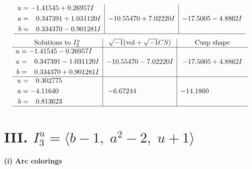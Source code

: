 \documentclass[1p]{elsarticle_modified}
\theoremstyle{definition}
\newcommand{\I}{\sqrt{-1}}
\begin{document}
$$\begin{array}{c|c|c}
\begin{aligned}
u &= -1.41545 + 0.26957 I \\
a &= \phantom{-}0.347391 + 1.031120 I \\
b &= \phantom{-}0.334370 - 0.901281 I\end{aligned}
 & -10.55470 + 7.02220 I & -17.5005 - 4.8862 I\\
 \hline 
 \end{array}$$\newpage$$\begin{array}{c|c|c}  
\text{Solutions to }I^u_{2}& \I (\text{vol} + \sqrt{-1}CS) & \text{Cusp shape}\\
 \hline 
\begin{aligned}
u &= -1.41545 - 0.26957 I \\
a &= \phantom{-}0.347391 - 1.031120 I \\
b &= \phantom{-}0.334370 + 0.901281 I\end{aligned}
 & -10.55470 - 7.02220 I & -17.5005 + 4.8862 I \\ \hline\begin{aligned}
u &= \phantom{-}0.302775\phantom{ +0.000000I} \\
a &= -4.11640\phantom{ +0.000000I} \\
b &= \phantom{-}0.813623\phantom{ +0.000000I}\end{aligned}
 & -6.67244\phantom{ +0.000000I} & -14.1860\phantom{ +0.000000I}\\
 \hline 
 \end{array}$$\newpage\newpage\renewcommand{\arraystretch}{1}
\centering \section*{III. $I^u_{3}= \langle b-1,\;a^2-2,\;u+1 \rangle$}
\flushleft \textbf{(i) Arc colorings}\\
\end{document}
